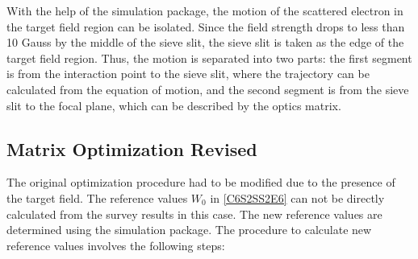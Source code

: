 With the help of the simulation package, the motion of the scattered electron in the target field region can be isolated. Since the field strength drops to less than 10 Gauss by the middle of the sieve slit, the sieve slit is taken as the edge of the target field region. Thus, the motion is separated into two parts: the first segment is from the interaction point to the sieve slit, where the trajectory can be calculated from the equation of motion, and the second segment is from the sieve slit to the focal plane, which can be described by the optics matrix.

\subsection{Matrix Optimization Revised}
\label{C6S2SS4}

The original optimization procedure had to be modified due to the presence of the target field. The reference values $W_0$ in \cref{C6S2SS2E6} can not be directly calculated from the survey results in this case. The new reference values are determined using the simulation package. The procedure to calculate new reference values involves the following steps:
